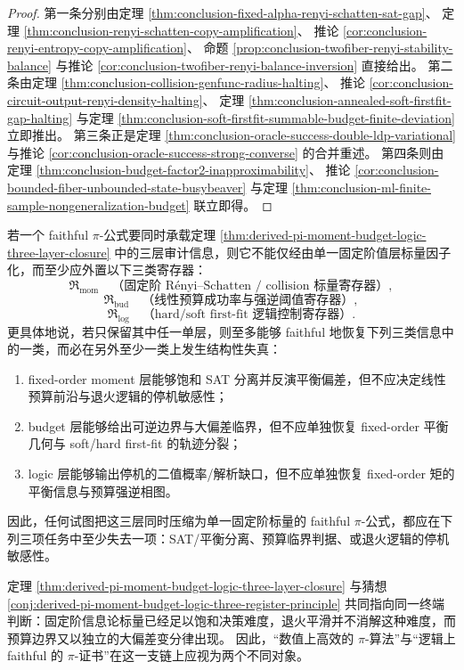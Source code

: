 \begin{proof}
第一条分别由定理 \ref{thm:conclusion-fixed-alpha-renyi-schatten-sat-gap}、
定理 \ref{thm:conclusion-renyi-schatten-copy-amplification}、
推论 \ref{cor:conclusion-renyi-entropy-copy-amplification}、
命题 \ref{prop:conclusion-twofiber-renyi-stability-balance}
与推论 \ref{cor:conclusion-twofiber-renyi-balance-inversion} 直接给出。
第二条由定理 \ref{thm:conclusion-collision-genfunc-radius-halting}、
推论 \ref{cor:conclusion-circuit-output-renyi-density-halting}、
定理 \ref{thm:conclusion-annealed-soft-firstfit-gap-halting}
与定理 \ref{thm:conclusion-soft-firstfit-summable-budget-finite-deviation} 立即推出。
第三条正是定理 \ref{thm:conclusion-oracle-success-double-ldp-variational}
与推论 \ref{cor:conclusion-oracle-success-strong-converse} 的合并重述。
第四条则由定理 \ref{thm:conclusion-budget-factor2-inapproximability}、
推论 \ref{cor:conclusion-bounded-fiber-unbounded-state-busybeaver}
与定理 \ref{thm:conclusion-ml-finite-sample-nongeneralization-budget} 联立即得。
\end{proof}

\begin{conjecture}\label{conj:derived-pi-moment-budget-logic-three-register-principle}
若一个 faithful \(\pi\)-公式要同时承载定理
\ref{thm:derived-pi-moment-budget-logic-three-layer-closure}
中的三层审计信息，则它不能仅经由单一固定阶值层标量因子化，而至少应外置以下三类寄存器：
\[
\mathfrak R_{\mathrm{mom}}
\quad\text{（固定阶 Rényi--Schatten / collision 标量寄存器）},
\]
\[
\mathfrak R_{\mathrm{bud}}
\quad\text{（线性预算成功率与强逆阈值寄存器）},
\]
\[
\mathfrak R_{\mathrm{log}}
\quad\text{（hard/soft first-fit 逻辑控制寄存器）}.
\]
更具体地说，若只保留其中任一单层，则至多能够 faithful 地恢复下列三类信息中的一类，而必在另外至少一类上发生结构性失真：
\begin{enumerate}
\normalfont
  \item fixed-order moment 层能够饱和 SAT 分离并反演平衡偏差，但不应决定线性预算前沿与退火逻辑的停机敏感性；
  \item budget 层能够给出可逆边界与大偏差临界，但不应单独恢复 fixed-order 平衡几何与 soft/hard first-fit 的轨迹分裂；
  \item logic 层能够输出停机的二值概率/解析缺口，但不应单独恢复 fixed-order 矩的平衡信息与预算强逆相图。
\end{enumerate}
因此，任何试图把这三层同时压缩为单一固定阶标量的 faithful \(\pi\)-公式，都应在下列三项任务中至少失去一项：SAT/平衡分离、预算临界判据、或退火逻辑的停机敏感性。
\end{conjecture}

\begin{remark}\label{rem:derived-pi-moment-budget-logic-separation}
定理 \ref{thm:derived-pi-moment-budget-logic-three-layer-closure} 与猜想
\ref{conj:derived-pi-moment-budget-logic-three-register-principle}
共同指向同一终端判断：固定阶信息论标量已经足以饱和决策难度，退火平滑并不消解这种难度，而预算边界又以独立的大偏差变分律出现。
因此，“数值上高效的 \(\pi\)-算法”与“逻辑上 faithful 的 \(\pi\)-证书”在这一支链上应视为两个不同对象。
\end{remark}

\endinput
